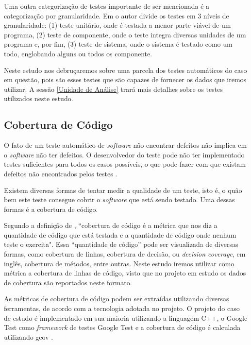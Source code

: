 \documentclass[11.5pt]{article}
\begin{document}
Uma outra categorização de testes importante de ser mencionada é a categorização por granularidade.
Em \cite{engSwSommerville} o autor divide os testes em 3 níveis de granularidade:
(1) teste unitário, onde é testada a menor parte viável de um programa,
(2) teste de componente, onde o teste integra diversas unidades de um programa e, por fim,
(3) teste de sistema, onde o sistema é testado como um todo, englobando alguns ou todos os
componente.

Neste estudo nos debruçaremos sobre uma parcela dos testes automáticos do caso em questão, pois são
esses testes que são capazes de fornecer os dados que iremos utilizar. A sessão
\ref{Unidade de Análise} trará mais detalhes sobre os testes utilizados neste estudo.



\subsection{Cobertura de Código}

O fato de um teste automático de \textit{software} não encontrar defeitos não implica em o
\textit{software} não ter defeitos.
O desenvolvedor do teste pode não ter implementado testes suficientes para todos os casos possíveis,
o que pode fazer com que existam defeitos não encontrados pelos testes \cite{engSwSommerville}.

Existem diversas formas de tentar medir a qualidade de um teste, isto é, o quão bem este teste
consegue cobrir o \textit{software} que está sendo testado.
Uma dessas formas é a cobertura de código.

Segundo a definição de \cite{tddBook}, ``cobertura de código é a métrica que nos diz a quantidade de
código que está testada e a quantidade de código onde nenhum teste o exercita".
Essa ``quantidade de código'' pode ser visualizada de diversas formas, como cobertura de linhas,
cobertura de decisão, ou \textit{decision coverage}, em inglês, cobertura de métodos, entre outras.
Neste estudo iremos utilizar como métrica a cobertura de linhas de código, visto que no projeto em
estudo os dados de cobertura são reportados neste formato.

As métricas de cobertura de código podem ser extraídas utilizando diversas ferramentas, de acordo
com a tecnologia adotada no projeto.
O projeto do caso de estudo é implementado em sua maioria utilizando a linguagem C++, o
Google Test \cite{googleTest} como \textit{framework} de testes Google Test \cite{googleTest} e
a cobertura de código é calculada utilizando gcov \cite{gcov}.
\end{document}
